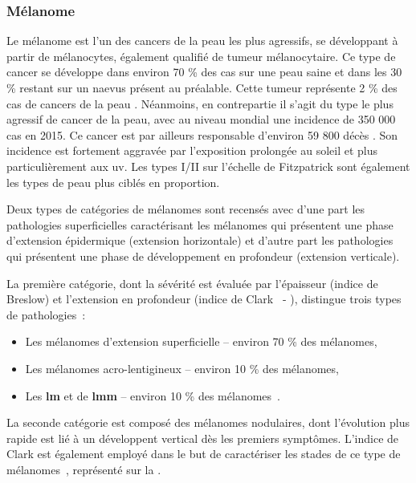 \subsubsection{Mélanome}
Le mélanome est l'un des cancers de la peau les plus agressifs, se développant à partir de mélanocytes, également qualifié de tumeur mélanocytaire. Ce type de cancer se développe dans environ 70 \% des cas sur une peau saine et dans les 30 \% restant sur un naevus présent au préalable. Cette tumeur représente 2 \% des cas de cancers de la peau \cite{TortoraG;Derrickson2012}. Néanmoins, en contrepartie il s’agit du type le plus agressif de cancer de la peau, avec au niveau mondial une incidence de 350 000 cas en 2015. Ce cancer est par ailleurs responsable d’environ 59 800 décès \cite{Karimkhani2017}. Son incidence est fortement aggravée par l’exposition prolongée au soleil et plus particulièrement aux \gls{uv}. Les types I/II sur l’échelle de Fitzpatrick sont également les types de peau plus ciblés en proportion.\par

Deux types de catégories de mélanomes sont recensés avec d’une part les pathologies superficielles caractérisant les mélanomes qui présentent une phase d’extension épidermique (extension horizontale) et d'autre part les pathologies qui présentent une phase de développement en profondeur (extension verticale).\par

La première catégorie, dont la sévérité est évaluée par l'épaisseur (indice de Breslow) et l'extension en profondeur (indice de Clark~\cite{Clark1969} - ), distingue trois types de pathologies~:
\begin{itemize}
    \item Les mélanomes d'extension superficielle – environ 70 \% des mélanomes,
    \item Les mélanomes acro-lentigineux – environ 10 \% des mélanomes,
    \item Les \textbf{\acrlong{lm}} et de \textbf{\acrlong{lmm}} – environ 10 \% des mélanomes~\cite{LeGal2011}.
\end{itemize}

La seconde catégorie est composé des mélanomes nodulaires, dont l'évolution plus rapide est lié à un développent vertical dès les premiers symptômes. L'indice de Clark est également employé dans le but de caractériser les stades de ce type de mélanomes~\cite{Clark1969}, représenté sur la .\par

